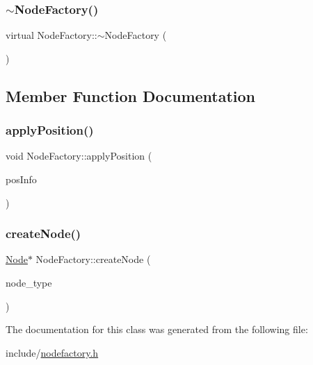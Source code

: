 \subsubsection{\texorpdfstring{$\sim$\+Node\+Factory()}{~NodeFactory()}}
{\footnotesize\ttfamily virtual Node\+Factory\+::$\sim$\+Node\+Factory (\begin{DoxyParamCaption}{ }\end{DoxyParamCaption})\hspace{0.3cm}{\ttfamily [virtual]}}



\subsection{Member Function Documentation}
\mbox{\label{classNodeFactory_a9eb2e94e99b0c087968e76775fbbdf07}} 
\subsubsection{\texorpdfstring{apply\+Position()}{applyPosition()}}
{\footnotesize\ttfamily void Node\+Factory\+::apply\+Position (\begin{DoxyParamCaption}\item[{\hyperlink{classPosInfo}{Pos\+Info}}]{pos\+Info }\end{DoxyParamCaption})}

\mbox{\label{classNodeFactory_ac8757ee2441a4439b8bda6ed5296ede1}} 
\subsubsection{\texorpdfstring{create\+Node()}{createNode()}}
{\footnotesize\ttfamily \hyperlink{classNode}{Node}$\ast$ Node\+Factory\+::create\+Node (\begin{DoxyParamCaption}\item[{\hyperlink{statics_8h_a1ec6d4bfce2e004debbc141eafc512db}{N\+O\+D\+E\+\_\+\+T\+Y\+PE}}]{node\+\_\+type }\end{DoxyParamCaption})}



The documentation for this class was generated from the following file\+:\begin{DoxyCompactItemize}
\item 
include/\hyperlink{nodefactory_8h}{nodefactory.\+h}\end{DoxyCompactItemize}
